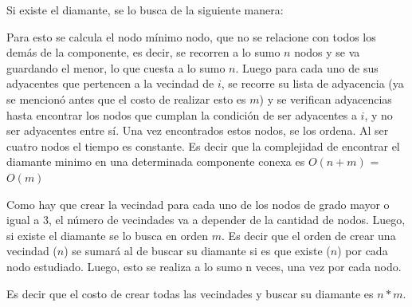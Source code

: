 \documentclass[a4paper,11pt] {article}
\begin{document}
Si existe el diamante, se lo busca de la siguiente manera:

Para esto se calcula el nodo mínimo nodo, que no se relacione con todos los demás de la componente, es decir, se recorren a lo sumo $n$ nodos y se va guardando el menor, lo que cuesta a lo sumo $n$.
Luego para cada uno de sus adyacentes que pertencen a la vecindad de $i$, se recorre su lista de adyacencia (ya se mencionó antes que el costo de realizar esto es $m$) y se verifican adyacencias hasta encontrar los nodos que cumplan la condición de ser adyacentes a $i$, y no ser adyacentes entre sí.
Una vez encontrados estos nodos, se los ordena. Al ser cuatro nodos el tiempo es constante. 
Es decir que la complejidad de encontrar el diamante minimo en una determinada componente conexa es $O(n + m)$ = $O (m)$

Como hay que crear la vecindad para cada uno de los nodos de grado mayor o igual a 3, el número de vecindades va a depender de la cantidad de nodos. Luego, si existe el diamante se lo busca en orden $m$.
Es decir que el orden de crear una vecindad ($n$) se sumará al de buscar su diamante si es que existe ($n$) por cada nodo estudiado. Luego, esto se realiza a lo sumo n veces, una vez por cada nodo.

Es decir que el costo de crear todas las vecindades y buscar su diamante es $n * m$.
\end{document}
